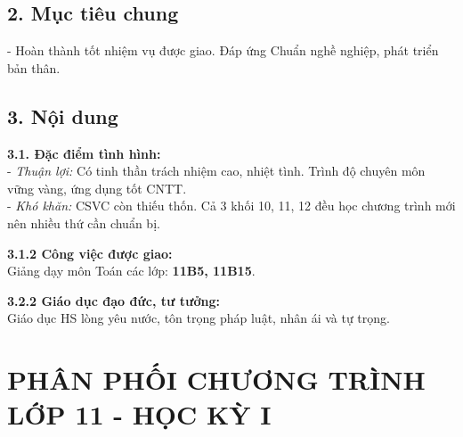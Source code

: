 \documentclass[12pt,a4paper]{article}
\begin{document}
\subsection*{2. Mục tiêu chung}
- Hoàn thành tốt nhiệm vụ được giao. Đáp ứng Chuẩn nghề nghiệp, phát triển bản thân.

\subsection*{3. Nội dung}
\textbf{3.1. Đặc điểm tình hình:}\\
- \textit{Thuận lợi:} Có tinh thần trách nhiệm cao, nhiệt tình. Trình độ chuyên môn vững vàng, ứng dụng tốt CNTT.\\
- \textit{Khó khăn:} CSVC còn thiếu thốn. Cả 3 khối 10, 11, 12 đều học chương trình mới nên nhiều thứ cần chuẩn bị.

\textbf{3.1.2 Công việc được giao:}\\
Giảng dạy môn Toán các lớp: \textbf{11B5, 11B15}.

\textbf{3.2.2 Giáo dục đạo đức, tư tưởng:}\\
Giáo dục HS lòng yêu nước, tôn trọng pháp luật, nhân ái và tự trọng.

\section{PHÂN PHỐI CHƯƠNG TRÌNH LỚP 11 - HỌC KỲ I}
\end{document}
